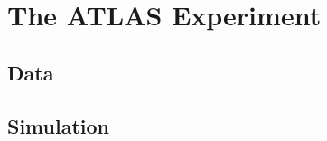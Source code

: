 \chapter[The ATLAS Experiment][The ATLAS Experiment]{The ATLAS Experiment}

\section{Data}

\section{Simulation}
